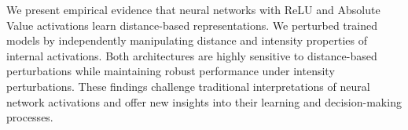 We present empirical evidence that neural networks with ReLU and Absolute Value activations learn distance-based representations. We perturbed trained models by independently manipulating distance and intensity properties of internal activations. Both architectures are highly sensitive to distance-based perturbations while maintaining robust performance under intensity perturbations. These findings challenge traditional interpretations of neural network activations and offer new insights into their learning and decision-making processes.
